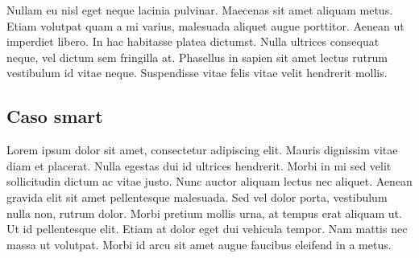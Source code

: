 \documentclass[11pt,a4paper,italian]{article}
\begin{document}
Nullam eu nisl eget neque lacinia pulvinar. Maecenas sit amet aliquam metus. Etiam volutpat quam a mi varius, malesuada aliquet augue porttitor. Aenean ut imperdiet libero. In hac habitasse platea dictumst. Nulla ultrices consequat neque, vel dictum sem fringilla at. Phasellus in sapien sit amet lectus rutrum vestibulum id vitae neque. Suspendisse vitae felis vitae velit hendrerit mollis.


\subsection{Caso smart}
Lorem ipsum dolor sit amet, consectetur adipiscing elit. Mauris dignissim vitae diam et placerat. Nulla egestas dui id ultrices hendrerit. Morbi in mi sed velit sollicitudin dictum ac vitae justo. Nunc auctor aliquam lectus nec aliquet. Aenean gravida elit sit amet pellentesque malesuada. Sed vel dolor porta, vestibulum nulla non, rutrum dolor. Morbi pretium mollis urna, at tempus erat aliquam ut. Ut id pellentesque elit. Etiam at dolor eget dui vehicula tempor. Nam mattis nec massa ut volutpat. Morbi id arcu sit amet augue faucibus eleifend in a metus.
\end{document}
